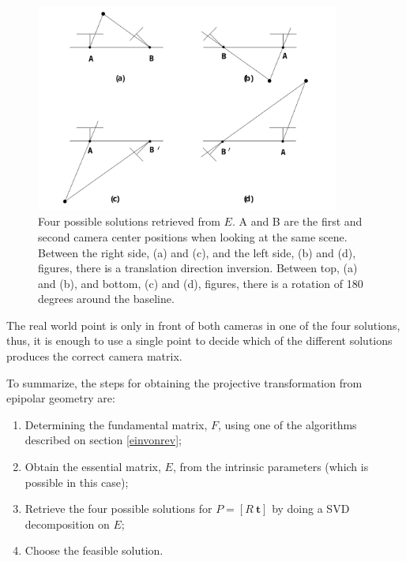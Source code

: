 \begin{figure}[ht]
	\centering
	\includegraphics[width=10cm]{images/ep4sols.png}
	\caption[Four possible solutions retrieved from $E$]{Four possible solutions retrieved from $E$. A and B are the first and second camera center positions when looking at the same scene. Between the right side, (a) and (c), and the left side, (b) and (d), figures, there is a translation direction inversion. Between top, (a) and (b), and bottom, (c) and (d), figures, there is a rotation of 180 degrees around the baseline. \cite{epipolar}}
	\label{sec2:fig:ep4}
\end{figure}
The real world point is only in front of both cameras in one of the four solutions, thus, it is enough to use a single point to decide which of the different solutions produces the correct camera matrix. \cite{epipolar}

To summarize, the steps for obtaining the projective transformation from epipolar geometry are:
\begin{enumerate}
	\item Determining the fundamental matrix, $F$, using one of the algorithms described on section \ref{einvonrev};
	\item Obtain the essential matrix, $E$, from the intrinsic parameters (which is possible in this case);
	\item Retrieve the four possible solutions for $P = [R \ \mathbf{t}]$ by doing a SVD decomposition on $E$;
	\item Choose the feasible solution.
\end{enumerate}